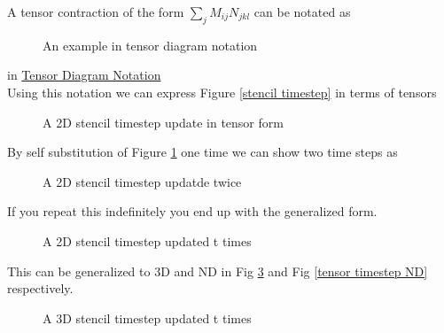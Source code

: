 \documentclass{article}
\begin{document}
A tensor contraction of the form $\sum_j M_{ij}N_{jkl}$ can be notated as \\

\begin{figure}[H]
	\begin{mdframed}[backgroundcolor=myFigureColour]
		
		\caption{An example in tensor diagram notation}
	\end{mdframed}
\end{figure}

in \href{http://tensornetwork.org/diagrams/}{Tensor Diagram Notation} \\

Using this notation we can express Figure \ref{stencil timestep} in terms of tensors

\begin{figure}[H]
	\begin{mdframed}[backgroundcolor=myFigureColour]
		
		\caption{A 2D stencil timestep update in tensor form}
		\label{tensor timestep}
	\end{mdframed}
\end{figure}

By self substitution of Figure \ref{tensor timestep} one time we can show two time steps as

\begin{figure}[H]
	\begin{mdframed}[backgroundcolor=myFigureColour]
		
		\caption{A 2D stencil timestep updatde twice}
	\end{mdframed}
\end{figure}

If you repeat this indefinitely you end up with the generalized form.

\begin{figure}[H]
	\begin{mdframed}[backgroundcolor=myFigureColour]
		
		\caption{A 2D stencil timestep updated t times}
		\label{tensor timestep 2D}
	\end{mdframed}
\end{figure}

This can be generalized to 3D and ND in Fig \ref{tensor timestep 3D} and Fig \ref{tensor timestep ND} respectively.


\begin{figure}[H]
	\begin{mdframed}[backgroundcolor=myFigureColour]
		
		\caption{A 3D stencil timestep updated t times}
		\label{tensor timestep 3D}
	\end{mdframed}
\end{figure}
\end{document}

